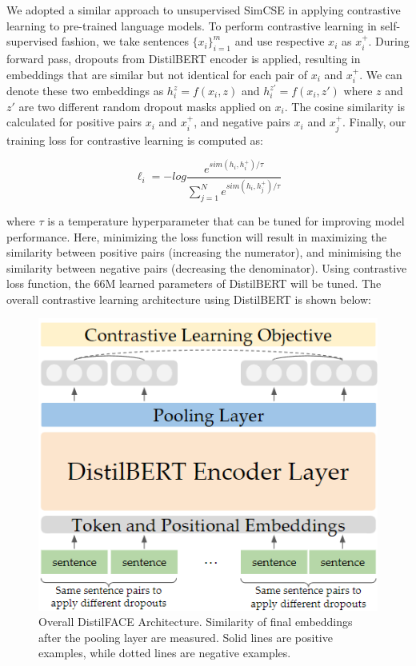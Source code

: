 \documentclass[10pt,twocolumn,letterpaper]{article}
\begin{document}
We adopted a similar approach to unsupervised SimCSE \cite{2104.08821} in applying contrastive learning to pre-trained language models. To perform contrastive learning in self-supervised fashion, we take sentences \(\{x_i\}^m_{i=1}\) and use respective \(x_i\) as \(x_i^+\). During forward pass, dropouts from DistilBERT encoder is applied, resulting in embeddings that are similar but not identical for each pair of \(x_i\) and \(x_i^+\). We can denote these two embeddings as \(h_i^{z} = f(x_i, z)\) and \(h_i^{z'} = f(x_i, z')\) where \(z\) and \(z'\) are two different random dropout masks applied on \(x_i\). The cosine similarity is calculated for positive pairs \(x_i\) and \(x_i^+\), and negative pairs \(x_i\) and \(x_j^+\). Finally, our training loss for contrastive learning is computed as:

\[ \ell_i = -log \frac{e^{sim(h_i, h_i^+)/\tau}}{\sum_{j=1}^N e^{sim(h_i, h_j^+)/\tau}} \]

where \( \tau \) is a temperature hyperparameter that can be tuned for improving model performance. Here, minimizing the loss function will result in maximizing the similarity between positive pairs (increasing the numerator), and minimising the similarity between negative pairs (decreasing the denominator). Using contrastive loss function, the 66M learned parameters of DistilBERT will be tuned. The overall contrastive learning architecture using DistilBERT is shown below:

\begin{figure}[hbt!]
\centering
\includegraphics[scale=0.65]{images/DistilFACE-Architecture.png}
\caption{Overall DistilFACE Architecture. Similarity of final embeddings after the pooling layer are measured. Solid lines are positive examples, while dotted lines are negative examples.}
\label{fig:short}
\end{figure}
\end{document}

